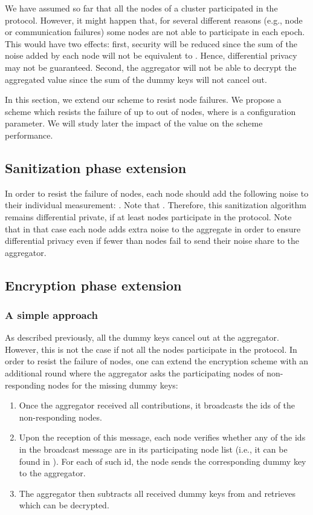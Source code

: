 \documentclass[11pt,a4paper]{article}
\theoremstyle{plain}
\theoremstyle{plain}
\theoremstyle{plain}
\theoremstyle{plain}
\theoremstyle{nonumberplain} \theoremseparator{}
\begin{document}
We have assumed so far that all the  nodes of a cluster
participated in the protocol. However, it might happen that, for
several different reasons (e.g., node or communication failures) some
nodes are not able to participate in each epoch. This would have two effects: first, 
security will be reduced since the sum of the noise added by each node will not be 
equivalent to . Hence, differential privacy may not be guaranteed.
Second, the aggregator will not be able to decrypt the aggregated value since the sum of 
the dummy keys will not cancel out.

In this section, we extend our scheme to resist node failures. We propose
a scheme which resists the failure of up to  out of  nodes, 
where  is a configuration parameter. We will study later the
impact of the value  on the scheme performance.


\subsection{Sanitization phase extension}

In order to resist the failure of  nodes, each node should add the following
noise to their individual measurement: . Note that
. Therefore, this sanitization algorithm remains differential private, if at least  nodes participate in the protocol. Note that in that case each node adds extra noise to the aggregate in order to ensure differential privacy even if fewer than  nodes fail to send their noise share to the aggregator. 

\subsection{Encryption phase extension}
\subsubsection{A simple approach}

As described previously, all the dummy keys cancel out at the aggregator.
However, this is not the case if not all the nodes participate in the protocol. In order to resist the failure of nodes, one can extend the encryption scheme with an additional round where the 
aggregator asks the participating nodes of non-responding nodes for the missing dummy keys:
\begin{enumerate}
\item Once the aggregator received all contributions, it broadcasts the ids of the non-responding nodes. 
\item Upon the reception of this message, each node  verifies whether any of the ids in the broadcast message are in its participating node list (i.e., it can be found in ). For each of such id, the node sends the corresponding dummy key to the aggregator.
\item The aggregator then subtracts all received dummy keys from  and retrieves   which can be decrypted.
\end{enumerate}
\end{document}
